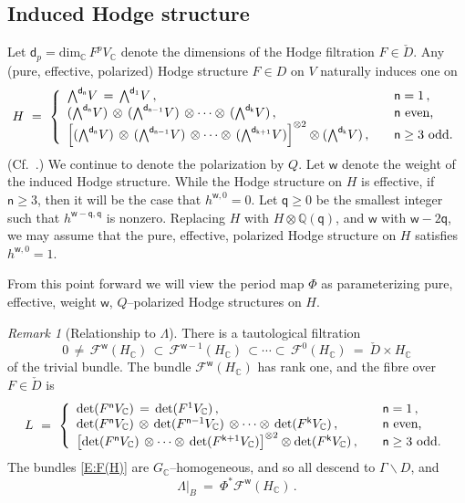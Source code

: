 \documentclass[12pt]{amsart}
\numberwithin{equation}{section}
\numberwithin{table}{section}
\def\bC{\mathbb{C}}
\def\tdet{\mathrm{det}}
\def\tdim{\mathrm{dim}}
\def\cF{\mathcal{F}}
\def\sfk{\mathsf{k}}
\def\sfn{\mathsf{n}}
\def\bQ{\mathbb{Q}}
\def\sfw{\mathsf{w}}
\def\bs{\backslash}
\def\ot{\otimes}
\def\tw{\hbox{\small $\bigwedge$}}
\theoremstyle{definition}
\theoremstyle{definition}
\theoremstyle{remark}
\newtheorem{remark}[equation]{Remark}
\def\bs{\backslash}
\def\sfd{\mathsf{d}}
\def\sfq{\mathsf{q}}
\begin{document}
\subsection{Induced Hodge structure} \label{S:induced}

Let $\sfd_p = \tdim_\bC\,F^pV_\bC$ denote the dimensions of the Hodge filtration $F \in \check D$.  Any (pure, effective, polarized) Hodge structure $F \in D$ on $V$ naturally induces one on
\[
  H \ = \ 
  \left\{ \begin{array}{ll}
  \tw^{\sfd_\sfn}V \,=\, \tw^{\sfd_1}V \,,\quad &
  \sfn = 1 \,,\\
  (\tw^{\sfd_\sfn}V) \,\ot\,
  (\tw^{\sfd_{\sfn-1}} V) \,\ot \cdots \ot\,
  (\tw^{\sfd_\sfk} V) \,,\quad & \sfn \hbox{ even,}\\
  \left[(\tw^{\sfd_\sfn}V) \,\ot\,
  (\tw^{\sfd_{\sfn-1}} V) \,\ot \cdots \ot\,
  (\tw^{\sfd_{\sfk+1}} V)\right]^{\ot 2} 
  \ot (\tw^{\sfd_\sfk}V) \,,\quad & \sfn \ge 3 \hbox{ odd.}
  \end{array}\right.
\]
(Cf.~\cite[\S5]{GGR-part1}.)  We continue to denote the polarization by $Q$.  Let $\sfw$ denote the weight of the induced Hodge structure.  While the Hodge structure on $H$ is effective, if $\sfn\ge3$, then it will be the case that $h^{\sfw,0} = 0$.  Let $\sfq \ge0$ be the smallest integer such that $h^{\sfw-\sfq,\sfq}$ is nonzero.  Replacing $H$ with $H\ot\bQ(\sfq)$, and $\sfw$ with $\sfw-2\sfq$, we may assume that the pure, effective, polarized Hodge structure on $H$ satisfies $h^{\sfw,0}=1$.

From this point forward we will view the period map $\Phi$ as parameterizing pure, effective, weight $\sfw$, $Q$--polarized Hodge structures on $H$.

\begin{remark}[Relationship to $\Lambda$]
There is a tautological filtration  
\begin{equation}\label{E:F(H)}
  0 \,\not=\, \cF^\sfw(H_\bC) \,\subset\, \cF^{\sfw-1}(H_\bC) 
  \,\subset \cdots \subset\, 
  \cF^0(H_\bC) \ = \ \check D \times H_\bC
\end{equation}
of the trivial bundle.  The bundle $\cF^\sfw(H_\bC)$ has rank one, and the fibre over $F \in \check D$ is 
\[
  L \ = \ 
  \left\{ \begin{array}{ll}
  \tdet(F^\sfn V_\bC) \,=\, \tdet(F^1 V_\bC) \,,\quad & 
  \sfn = 1\,,\\
  \tdet(F^\sfn V_\bC) \,\ot\, \tdet(F^{\sfn-1} V_\bC) 
  \,\ot\cdots \ot\, \tdet(F^\sfk V_\bC) \,,\quad &
  \sfn \hbox{ even,} \\
  \left[\tdet(F^\sfn V_\bC) 
  \,\ot\cdots \ot\, \tdet(F^{\sfk+1} V_\bC)\right]^{\ot 2}
  \ot \tdet(F^\sfk V_\bC) \,,\quad &
  \sfn \ge 3 \hbox{ odd.}
  \end{array}\right.
\]
The bundles \eqref{E:F(H)} are $G_\bC$--homogeneous, and so all descend to $\Gamma \bs D$, and 
\[
  \Lambda\big|_B \ = \ \Phi^* \cF^\sfw(H_\bC) \,.
\]
\end{remark}
\end{document}
